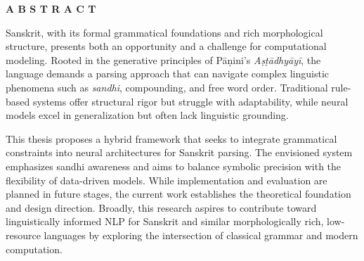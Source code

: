 \begin{center}
{\bf A B S T R A C T}
\end{center}

\setlength{\parindent}{1.5em}
\sloppy

Sanskrit, with its formal grammatical foundations and rich morphological structure, presents both an opportunity and a challenge for computational modeling. Rooted in the generative principles of Pāṇini's \textit{Aṣṭādhyāyī}, the language demands a parsing approach that can navigate complex linguistic phenomena such as \textit{sandhi}, compounding, and free word order. Traditional rule-based systems offer structural rigor but struggle with adaptability, while neural models excel in generalization but often lack linguistic grounding.

This thesis proposes a hybrid framework that seeks to integrate grammatical constraints into neural architectures for Sanskrit parsing. The envisioned system emphasizes sandhi awareness and aims to balance symbolic precision with the flexibility of data-driven models. While implementation and evaluation are planned in future stages, the current work establishes the theoretical foundation and design direction. Broadly, this research aspires to contribute toward linguistically informed NLP for Sanskrit and similar morphologically rich, low-resource languages by exploring the intersection of classical grammar and modern computation.
